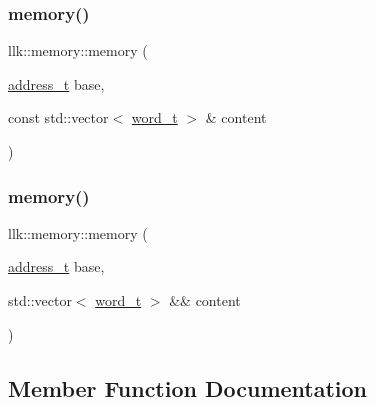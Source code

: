 \mbox{\label{classllk_1_1memory_ace253b499ac7e10d49b7e58ded343884}} 
\subsubsection{\texorpdfstring{memory()}{memory()}\hspace{0.1cm}{\footnotesize\ttfamily [3/4]}}
{\footnotesize\ttfamily llk\+::memory\+::memory (\begin{DoxyParamCaption}\item[{\hyperlink{classllk_1_1memory_ae7a4b897aa999f22e250dc8e4d773dec}{address\+\_\+t}}]{base,  }\item[{const std\+::vector$<$ \hyperlink{classllk_1_1memory_a432a6c0ae1bcb9c44d79cfa1a239419c}{word\+\_\+t} $>$ \&}]{content }\end{DoxyParamCaption})}

\mbox{\label{classllk_1_1memory_aafdc3d1f68de49e73d640b44fe9e1628}} 
\subsubsection{\texorpdfstring{memory()}{memory()}\hspace{0.1cm}{\footnotesize\ttfamily [4/4]}}
{\footnotesize\ttfamily llk\+::memory\+::memory (\begin{DoxyParamCaption}\item[{\hyperlink{classllk_1_1memory_ae7a4b897aa999f22e250dc8e4d773dec}{address\+\_\+t}}]{base,  }\item[{std\+::vector$<$ \hyperlink{classllk_1_1memory_a432a6c0ae1bcb9c44d79cfa1a239419c}{word\+\_\+t} $>$ \&\&}]{content }\end{DoxyParamCaption})}



\subsection{Member Function Documentation}
\mbox{\label{classllk_1_1memory_aa31d9d8c64a1b4f7d8dbeec82af0add2}} 
